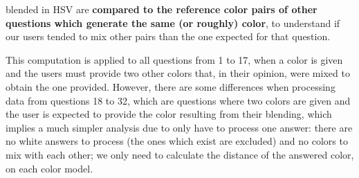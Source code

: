 blended in HSV are \textbf{compared to the reference color pairs of other questions which generate the same (or roughly) color}, to understand if our users tended to mix other pairs
than the one expected for that question. \par
%
This computation is applied to all questions from 1 to 17, when a color is given and the users must provide two other colors that, in their opinion, were mixed to obtain the one provided.
However, there are some differences when processing data from questions 18 to 32, which are questions where two colors are given and the user is expected to provide the color resulting from their blending, which
implies a much simpler analysis due to only have to process one answer: there are no white answers to process (the ones which exist are excluded) and no colors to mix with each other; we only need to calculate
the distance of the answered color, on each color model.
%
